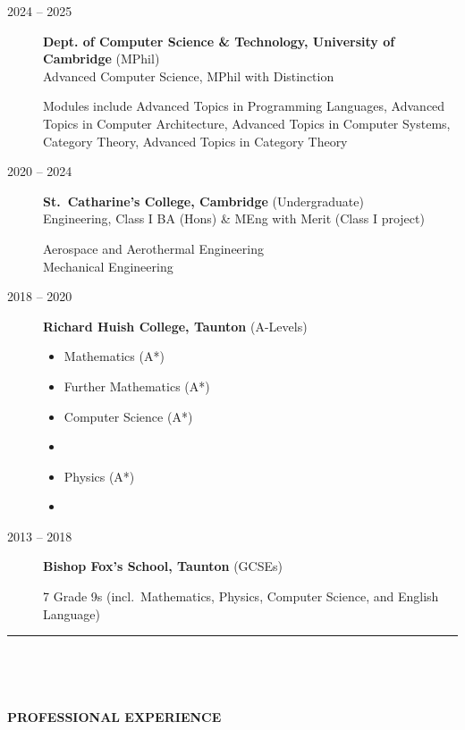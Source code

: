 \documentclass[
  11pt,
  a4paper,
]{article}
\providecommand{\tightlist}{%
  \setlength{\itemsep}{0pt}\setlength{\parskip}{0pt}}
\newcommand{\itemspace}{0.8ex}
\newcommand{\ruledheader}[2]{%
\begingroup
\setlength{\fboxsep}{0pt}%
\colorbox{#1}{%
\parbox[b][1.2ex][t]{35mm}{\begin{tiny}\ \end{tiny}}}%
\parbox[b][1.2ex][t]{5mm}{\begin{tiny}\ \end{tiny}}%
\uppercase{\textbf{#2}}
\endgroup}
\begin{document}
\begin{description}
\item[2024 – 2025]
\textbf{Dept. of Computer Science \& Technology, University of
Cambridge} (MPhil)\\
Advanced Computer Science, MPhil with Distinction

Modules include Advanced Topics in Programming Languages, Advanced
Topics in Computer Architecture, Advanced Topics in Computer Systems,
Category Theory, Advanced Topics in Category Theory
\item[2020 – 2024]
\textbf{St.~Catharine’s College, Cambridge} (Undergraduate)\\
Engineering, Class I BA (Hons) \& MEng with Merit (Class I project)

Aerospace and Aerothermal Engineering\\
Mechanical Engineering
\item[2018 – 2020]
\textbf{Richard Huish College, Taunton} (A-Levels)

\begingroup
\begin{multicols}{3}

\begin{itemize}
\tightlist
\item
  Mathematics (A*)
\item
  Further Mathematics (A*)
\item
  Computer Science (A*)
\item
\item
  Physics (A*)
\item
\end{itemize}

\end{multicols}
\vspace{-\parskip}\endgroup
\item[2013 – 2018]
\textbf{Bishop Fox’s School, Taunton} (GCSEs)

7 Grade 9s (incl.~Mathematics, Physics, Computer Science, and English
Language)
\end{description}

\begin{Large}

\vspace{-1.5ex}\rule{\textwidth}{0.8pt}\vspace{2ex}

\ruledheader{cyan!50!teal}{Professional experience}\end{Large}

\vspace{\itemspace}
\end{document}
